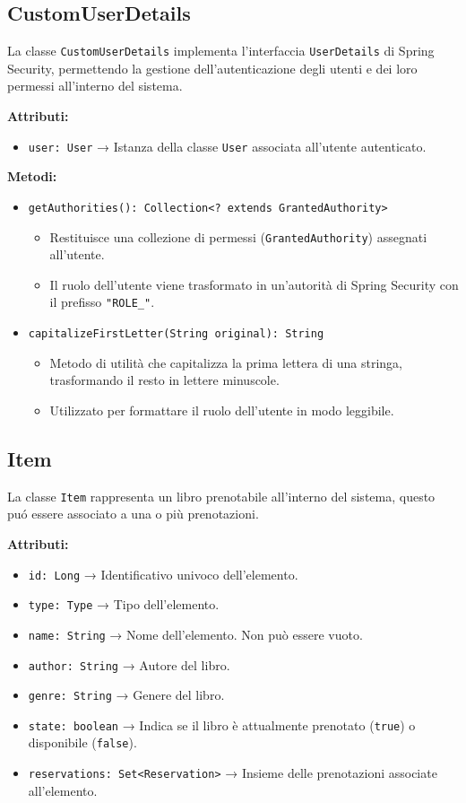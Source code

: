 \documentclass[twoside,openright,titlepage,fleqn,headinclude,12pt,a4paper,BCOR=5mm,footinclude]{scrbook}
\begin{document}
\subsection{CustomUserDetails}
La classe \texttt{CustomUserDetails} implementa l’interfaccia \texttt{UserDetails} di Spring Security, permettendo la gestione dell’autenticazione degli utenti e dei loro permessi all’interno del sistema.

\textbf{Attributi:}  
\begin{itemize}  
    \item \texttt{user: User} → Istanza della classe \texttt{User} associata all'utente autenticato.  
\end{itemize}  

\textbf{Metodi:}  
\begin{itemize}  

    \item \texttt{getAuthorities(): Collection<? extends GrantedAuthority>}  
    \begin{itemize}  
        \item Restituisce una collezione di permessi (\texttt{GrantedAuthority}) assegnati all'utente.  
        \item Il ruolo dell'utente viene trasformato in un'autorità di Spring Security con il prefisso \texttt{"ROLE\_"}.  
    \end{itemize}  
    \item \texttt{capitalizeFirstLetter(String original): String}  
    \begin{itemize}  
        \item Metodo di utilità che capitalizza la prima lettera di una stringa, trasformando il resto in lettere minuscole.  
        \item Utilizzato per formattare il ruolo dell'utente in modo leggibile.  
    \end{itemize}    
\end{itemize}  

\subsection{Item}
La classe \texttt{Item} rappresenta un libro prenotabile all'interno del sistema, questo puó essere associato a una o più prenotazioni.

\textbf{Attributi:}  
\begin{itemize}  
    \item \texttt{id: Long} → Identificativo univoco dell'elemento.  
    \item \texttt{type: Type} → Tipo dell'elemento.
    \item \texttt{name: String} → Nome dell'elemento. Non può essere vuoto.  
    \item \texttt{author: String} → Autore del libro.  
    \item \texttt{genre: String} → Genere del libro.  
    \item \texttt{state: boolean} → Indica se il libro è attualmente prenotato (\texttt{true}) o disponibile (\texttt{false}).  
    \item \texttt{reservations: Set<Reservation>} → Insieme delle prenotazioni associate all'elemento.  
\end{itemize}  
\end{document}
